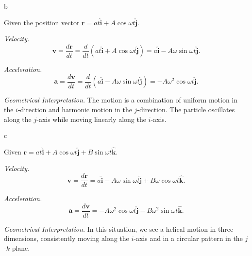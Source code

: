 \begin{solution}{6.4}{b}
	
	Given the position vector \(\mathbf{r} = a t \hat{\mathbf{i}} + A \cos \omega t \hat{\mathbf{j}}\).
	
	\textit{Velocity.}
	\[
	\mathbf{v} = \frac{d\mathbf{r}}{dt} = \frac{d}{dt}(a t \hat{\mathbf{i}} + A \cos \omega t \hat{\mathbf{j}}) = a \hat{\mathbf{i}} - A \omega \sin \omega t \hat{\mathbf{j}}.
	\]
	
	\textit{Acceleration.}
	\[
	\mathbf{a} = \frac{d\mathbf{v}}{dt} = \frac{d}{dt}(a \hat{\mathbf{i}} - A \omega \sin \omega t \hat{\mathbf{j}}) = -A \omega^2 \cos \omega t \hat{\mathbf{j}}.
	\]
	
	\textit{Geometrical Interpretation.}
	The motion is a combination of uniform motion in the \(i\)-direction and harmonic motion in the \(j\)-direction. The particle oscillates along the \(j\)-axis while moving linearly along the \(i\)-axis.
	
\end{solution}


\begin{solution}{6.4}{c}

	Given \(\mathbf{r} = a t \hat{\mathbf{i}} + A \cos \omega t \hat{\mathbf{j}} + B \sin \omega t \hat{\mathbf{k}}\).
	
	\textit{Velocity.}
	\[
	\mathbf{v} = \frac{d\mathbf{r}}{dt} = a \hat{\mathbf{i}} - A \omega \sin \omega t \hat{\mathbf{j}} + B \omega \cos \omega t \hat{\mathbf{k}}.
	\]
	
	\textit{Acceleration.}
	\[
	\mathbf{a} = \frac{d\mathbf{v}}{dt} = -A \omega^2 \cos \omega t \hat{\mathbf{j}} - B \omega^2 \sin \omega t \hat{\mathbf{k}}.
	\]
	
	\textit{Geometrical Interpretation.}
	In this situation, we see a helical motion in three dimensions, consistently moving along the \(i\)-axis and in a circular pattern in the \(j\)-\(k\) plane.
\end{solution}

